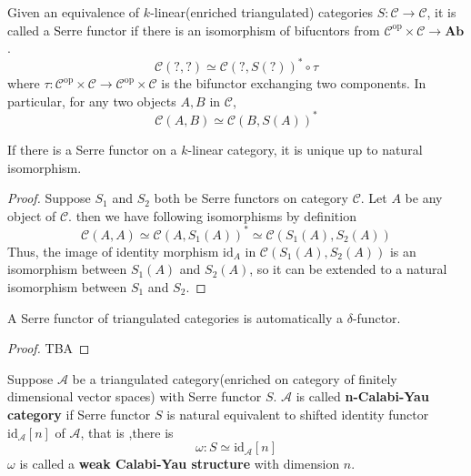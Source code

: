Given an equivalence of $k$-linear(enriched triangulated) categories $S: \mathcal{C} \rightarrow \mathcal{C}$, it is called a Serre functor if there is an isomorphism of bifucntors from $ \mathcal{C}^{\text{op}} \times \mathcal{C} \rightarrow \mathbf{Ab}$.
\[
\mathcal{C}(?,?) \simeq \mathcal{C}(?,S(?))^{*} \circ \tau
\]
where $\tau: \mathcal{C}^{\text{op}} \times \mathcal{C} \rightarrow \mathcal{C}^{\text{op}} \times \mathcal{C}$ is the bifunctor  exchanging two components. In particular, for any two objects $A,B$ in $\mathcal{C}$,
\[
\mathcal{C}(A,B) \simeq \mathcal{C}(B,S(A))^{*}
\]

\begin{prop}
If there is a Serre functor on a $k$-linear category, it is unique up to natural isomorphism.
\end{prop}
\begin{proof}
Suppose $S_1$ and $S_2$ both be Serre functors on category $\mathcal{C}$. Let $A$ be any object of $\mathcal{C}$. then we have following isomorphisms by definition
\[
\mathcal{C}(A,A) \simeq \mathcal{C}(A, S_1(A))^{*} \simeq \mathcal{C}(S_1(A),S_2(A))
\]
Thus, the image of identity morphism $\text{id}_A$ in $\mathcal{C}(S_1(A),S_2(A))$ is an isomorphism between $S_1(A)$ and $S_2(A)$, so it can be extended to a natural isomorphism between $S_1$ and $S_2$.
\end{proof}

\begin{prop}
A Serre functor of triangulated categories is automatically a $\delta $-functor.
\end{prop}
\begin{proof}
TBA
\end{proof}
\begin{mydefn}
Suppose $\mathcal{A}$ be a triangulated category(enriched on category of finitely dimensional vector spaces) with Serre functor $S$. $\mathcal{A}$ is called \textbf{n-Calabi-Yau category} if Serre functor $S$ is natural equivalent to shifted identity functor $\text{id}_{\mathcal{A}}[n]$ of $\mathcal{A}$, that is ,there is 
\[
\omega : S \simeq \text{id}_{\mathcal{A}}[n]
\]
$\omega$ is called a \textbf{weak Calabi-Yau structure} with dimension $n$.
\end{mydefn}